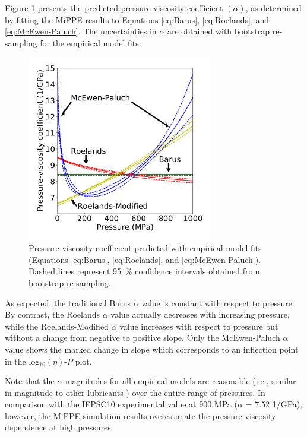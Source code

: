 \documentclass[preprint,review,12pt]{elsarticle}
\begin{document}
    Figure \ref{fig:viscosity_pressure_coefficent} presents the predicted pressure-viscosity coefficient $(\alpha)$, as determined by fitting the MiPPE results to Equations \ref{eq:Barus}, \ref{eq:Roelands}, and \ref{eq:McEwen-Paluch}. The uncertainties in $\alpha$ are obtained with bootstrap re-sampling for the empirical model fits. 
    
	\begin{figure}[htb!]
		\centering
		\includegraphics[width=3.2in]{Pressure_viscosity_coefficient.pdf}
		\caption{Pressure-viscosity coefficient predicted with empirical model fits (Equations \ref{eq:Barus}, \ref{eq:Roelands}, and \ref{eq:McEwen-Paluch}). Dashed lines represent 95~\% confidence intervals obtained from bootstrap re-sampling.}
		\label{fig:viscosity_pressure_coefficent}
	\end{figure}

As expected, the traditional Barus $\alpha$ value is constant with respect to pressure. By contrast, the Roelands $\alpha$ value actually decreases with increasing pressure, while the Roelands-Modified $\alpha$ value increases with respect to pressure but without a change from negative to positive slope. Only the McEwen-Paluch $\alpha$ value shows the marked change in slope which corresponds to an inflection point in the log$_{10}(\eta)$-$P$ plot. 

Note that the $\alpha$ magnitudes for all empirical models are reasonable (i.e., similar in magnitude to other lubricants \cite{Mundy1996,McCabe2001,Liu2015}) over the entire range of pressures. In comparison with the IFPSC10 experimental value at 900 MPa ($\alpha$ = 7.52 1/GPa), however, the MiPPE simulation results overestimate the pressure-viscosity dependence at high pressures.

	
\end{document}
